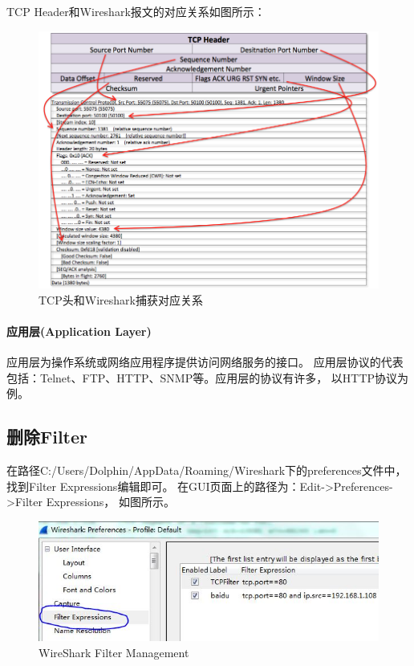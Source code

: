 \documentclass{book}
\begin{document}
TCP Header和Wireshark报文的对应关系如图所示：

\begin{figure}[htbp]
	\centering
	\includegraphics[scale=0.4]{TCPHeaderAndWireshark.jpg}
	\caption{TCP头和Wireshark捕获对应关系}
	\label{fig:TCPHeaderAndWireshark}
\end{figure}

\paragraph{应用层(Application Layer)}应用层为操作系统或网络应用程序提供访问网络服务的接口。
应用层协议的代表包括：Telnet、FTP、HTTP、SNMP等。应用层的协议有许多，
以HTTP协议为例。

\subsection{删除Filter}

在路径C:/Users/Dolphin/AppData/Roaming/Wireshark下的preferences文件中，
找到Filter Expressions编辑即可。
在GUI页面上的路径为：Edit->Preferences->Filter Expressions，
如图所示。

\begin{figure}[htbp]
	\centering
	\includegraphics[scale=0.6]{WireSharkFilterManagement.jpg}
	\caption{WireShark Filter Management}
	\label{fig:WireSharkFilterManagement}
\end{figure}
\end{document}
